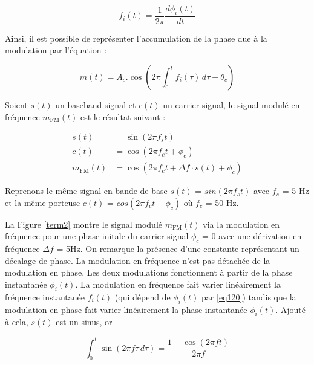 \begin{equation}\label{eq120}
f_i(t) = \frac{1}{2\pi} \frac{d\phi_i(t)}{dt}
\end{equation}

Ainsi, il est possible de représenter l'accumulation de la phase due à la modulation par l'équation :

\begin{equation}\label{eq121}
m(t) = A_c.\cos(2 \pi \int_{0}^{t} f_i(\tau) \, d\tau +  \theta_c)
\end{equation}

\vspace{0.1cm}

Soient $s(t)$ un baseband signal et $c(t)$ un carrier signal, le signal modulé en fréquence $m_\mathrm{FM}(t)$ est le résultat suivant :

\begin{align}
    s(t) &= \sin(2\pi f_{s}t) \\
    c(t) &= \cos(2\pi f_{c}t + \phi_{c}) \\
    m_\mathrm{FM}(t) &= \cos\left(2\pi f_{c}t + \Delta f \cdot s(t) + \phi_{c}\right)
\end{align}

\vspace{0.1cm}

Reprenons le même signal en bande de base 
$s(t)$ = $sin(2\pi f_{s}t)$ avec $f_{s}$ = 5 Hz et la même porteuse 
$c(t)$ = $cos(2\pi f_{c}t + \phi_{c})$ où $f_{c}$ = 50 Hz.

\vspace{0.1cm}

La Figure \ref{term2} montre le signal modulé $m_\mathrm{FM}(t)$ via la modulation en fréquence pour une phase initale du carrier signal $\phi_{c}$ = 0 avec une dérivation en fréquence $\Delta f$ = 5Hz. On remarque la présence d'une constante représentant un décalage de phase. La modulation en fréquence n'est pas détachée de la modulation en phase. Les deux modulations fonctionnent à partir de la phase instantanée $\phi_i(t)$. La modulation en fréquence fait varier linéairement la fréquence instantanée $f_i(t)$ (qui dépend de $\phi_i(t)$ par \ref{eq120}) tandis que la modulation en phase fait varier linéairement la phase instantanée $\phi_i(t)$. Ajouté à cela, $s(t)$ est un sinus, or 

\begin{equation}\label{eq122}
\int_{0}^{t} \sin(2 \pi f \tau \, d\tau) = \frac{1 - \cos(2\pi f t)}{2 \pi f}
\end{equation}

